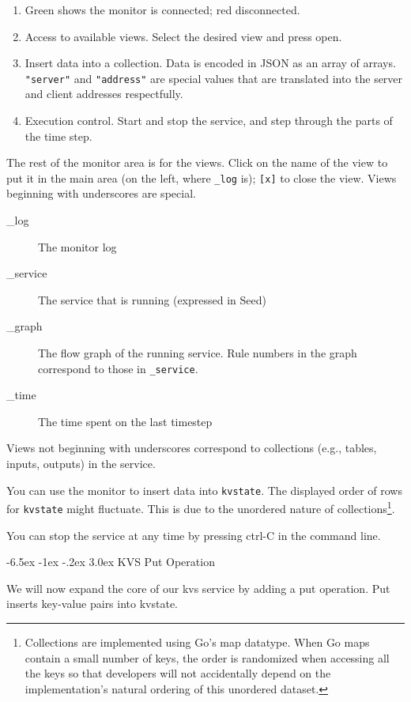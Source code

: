 \documentclass[a5paper,12pt,onecolumn]{article}
\makeatletter
\def\code#1{\mbox{\lstinline{#1}}}
\renewcommand\section{\@startsection {section}{1}{\z@}%
	{-6.5ex \@plus -1ex \@minus -.2ex}%
	{3.0ex}%
	{\sf\Large}}
\makeatother
\begin{document}
\begin{enumerate}
\item Green shows the monitor is connected; red disconnected.
\item Access to available views. Select the desired view and press open.
\item Insert data into a collection. Data is encoded in JSON as an array of arrays. \code{"server"} and \code{"address"} are special values that are translated into the server and client addresses respectfully.
\item Execution control. Start and stop the service, and step through the parts of the time step.
\end{enumerate}

The rest of the monitor area is for the views. Click on the name of the view to put it in the main area (on the left, where \code{_log} is); \code{[x]} to close the view. Views beginning with underscores are special.

\begin{description}
\item[\_log] The monitor log
\item[\_service] The service that is running (expressed in Seed)
\item[\_graph] The flow graph of the running service. Rule numbers in the graph correspond to those in \code{_service}.
\item[\_time] The time spent on the last timestep
\end{description}

Views not beginning with underscores correspond to collections (e.g., tables, inputs, outputs) in the service.

You can use the monitor to insert data into \code{kvstate}. The displayed order of rows for \code{kvstate} might fluctuate. This is due to the unordered nature of collections\footnote{Collections are implemented using Go's map datatype. When Go maps contain a small number of keys, the order is randomized when accessing all the keys so that developers will not accidentally depend on the implementation's natural ordering of this unordered dataset.}.

You can stop the service at any time by pressing ctrl-C in the command line.

\section{KVS Put Operation}

We will now expand the core of our kvs service by adding a put operation. Put inserts key-value pairs into kvstate.
\end{document}
